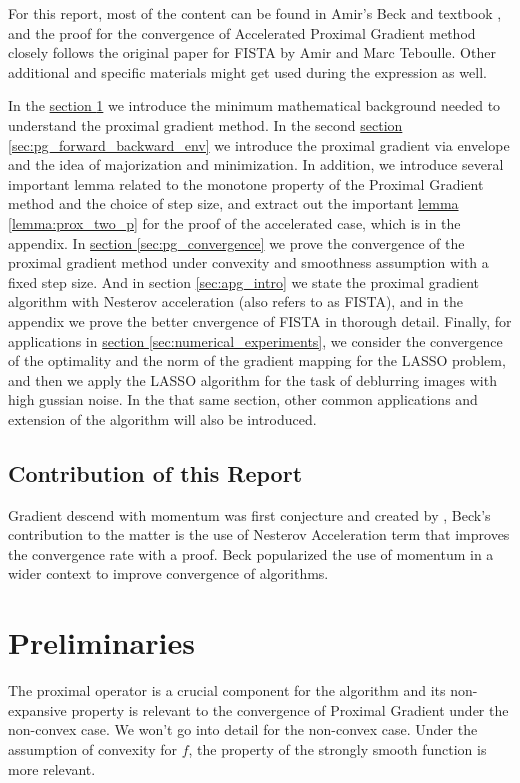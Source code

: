 \documentclass[]{article}
\theoremstyle{definition}
\begin{document}
    \par
    For this report, most of the content can be found in Amir's Beck and textbook \cite{book:first_order_opt}, and the proof for the convergence of Accelerated Proximal Gradient method closely follows the original paper for FISTA\cite{paper:FISTA} by Amir and Marc Teboulle. Other additional and specific materials might get used during the expression as well. 
    \par 
    In the \hyperref[sec:preliminaries]{section \ref*{sec:preliminaries}} we introduce the minimum mathematical background needed to understand the proximal gradient method. In the second \hyperref[sec:pg_forward_backward_env]{section \ref*{sec:pg_forward_backward_env}} we introduce the proximal gradient via envelope and the idea of majorization and minimization. In addition, we introduce several important lemma related to the monotone property of the Proximal Gradient method and the choice of step size, and extract out the important \hyperref[lemma:prox_two_p]{lemma \ref*{lemma:prox_two_p}} for the proof of the accelerated case, which is in the appendix. In \hyperref[sec:pg_convergence]{section \ref*{sec:pg_convergence}} we prove the convergence of the proximal gradient method under convexity and smoothness assumption with a fixed step size. And in section \ref*{sec:apg_intro} we state the proximal gradient algorithm with Nesterov acceleration (also refers to as FISTA), and in the appendix we prove the better cnvergence of FISTA in thorough detail. Finally, for applications in \hyperref[sec:numerical_experiments]{section \ref*{sec:numerical_experiments}}, we consider the convergence of the optimality and the norm of the gradient mapping for the LASSO problem, and then we apply the LASSO algorithm for the task of deblurring images with high gussian noise. In the that same section, other common applications and extension of the algorithm will also be introduced. 
    \subsection{Contribution of this Report}
        Gradient descend with momentum was first conjecture and created by , Beck's contribution to the matter is the use of Nesterov Acceleration term that improves the convergence rate with a proof. Beck popularized the use of momentum in a wider context to improve convergence of algorithms. 
\section{Preliminaries}\label{sec:preliminaries}
    The proximal operator is a crucial component for the algorithm and its non-expansive  property is relevant to the convergence of Proximal Gradient under the non-convex case. We won't go into detail for the non-convex case. Under the assumption of convexity for $f$, the property of the strongly smooth function is more relevant. 
\end{document}
